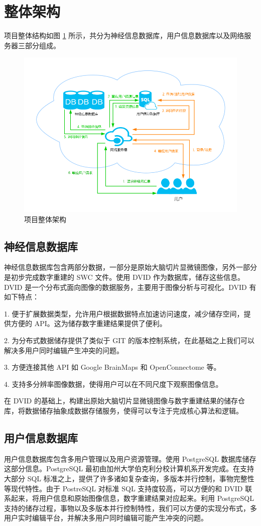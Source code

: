 \section{整体架构}
项目整体结构如图 \ref{server} 所示，共分为神经信息数据库，用户信息数据库以及网络服务器三部分组成。
\begin{figure}
\centering
\includegraphics[width=148mm]{images/server}
\caption{项目整体架构}
\label{server}
\end{figure}

\subsection{神经信息数据库}
神经信息数据库包含两部分数据，一部分是原始大脑切片显微镜图像，另外一部分是初步完成数字重建的 SWC 文件。使用 DVID 作为数据库，储存这些信息。DVID 是一个分布式面向图像的数据服务，主要用于图像分析与可视化。DVID 有如下特点：

1. 便于扩展数据类型，允许用户根据数据特点加速访问速度，减少储存空间，提供方便的 API。这为储存数字重建结果提供了便利。

2. 为分布式数据储存提供了类似于 GIT 的版本控制系统，在此基础之上我们可以解决多用户同时编辑产生冲突的问题。

3. 方便连接其他 API 如 Google BrainMaps 和 OpenConnectome 等。

4. 支持多分辨率图像数据，使得用户可以在不同尺度下观察图像信息。

在 DVID 的基础上，构建出原始大脑切片显微镜图像与数字重建结果的储存仓库，将数据储存抽象成数据存储服务，使得可以专注于完成核心算法和逻辑。

\subsection{用户信息数据库}
用户信息数据库包含多用户管理以及用户资源管理。使用 PostgreSQL 数据库储存这部分信息。PostgreSQL 最初由加州大学伯克利分校计算机系开发完成。在支持大部分 SQL 标准之上，提供了许多诸如复杂查询，多版本并行控制，事物完整性等现代特性。由于 PostreSQL 对标准 SQL 支持度较高，可以方便的和 DVID 联系起来，将用户信息和原始图像信息，数字重建结果对应起来。利用 PostgreSQL 支持的储存过程，事物以及多版本并行控制特性，我们可以方便的实现分布式，多用户实时编辑平台，并解决多用户同时编辑可能产生冲突的问题。

